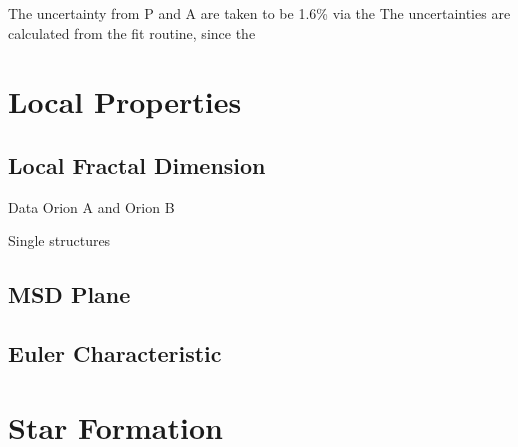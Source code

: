 The uncertainty from P and A are taken to be 1.6\% via the 
The uncertainties are calculated from the fit routine, since the 

\section{Local Properties}

\subsection{Local Fractal Dimension}

Data Orion A and Orion B

Single structures

\subsection{MSD Plane}

\subsection{Euler Characteristic}

\section{Star Formation}


